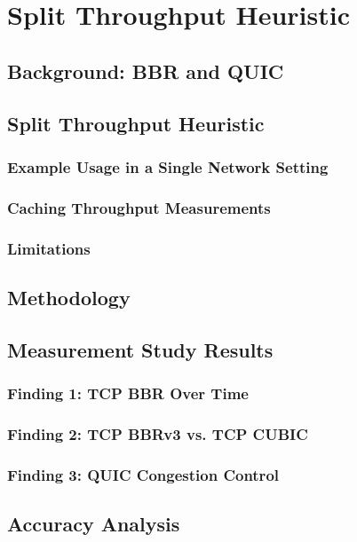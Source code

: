 \chapter{Split Throughput Heuristic}

\section{Background: BBR and QUIC}

\section{Split Throughput Heuristic}

\subsection{Example Usage in a Single Network Setting}
\subsection{Caching Throughput Measurements}
\subsection{Limitations}

\section{Methodology}

\section{Measurement Study Results}

\subsection{Finding 1: TCP BBR Over Time}
\subsection{Finding 2: TCP BBRv3 vs. TCP CUBIC}
\subsection{Finding 3: QUIC Congestion Control}

\section{Accuracy Analysis}